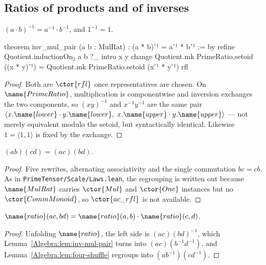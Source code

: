 \subsection{Ratios of products and of inverses}

\begin{lemma}
\label{Algebra:lem:inv-mul-pair}
$(a \cdot b)^{-1} = a^{-1} \cdot b^{-1}$, and $1^{-1} = 1$.
\end{lemma}

\begin{leancode}
theorem inv_mul_pair (a b : MulRat) :
    (a * b)⁻¹ = a⁻¹ * b⁻¹ := by
  refine Quotient.inductionOn₂ a b ?_
  intro x y
  change
    Quotient.mk PrimeRatio.setoid ((x * y)⁻¹) =
      Quotient.mk PrimeRatio.setoid (x⁻¹ * y⁻¹)
  rfl
\end{leancode}

\begin{proof}
Both are $\ctor{rfl}$ once representatives are chosen.  On
$\name{PrimeRatio}$, multiplication is componentwise and inversion exchanges
the two components, so $(xy)^{-1}$ and $x^{-1}y^{-1}$ are the same pair
$\langle x.\name{lower}\cdot y.\name{lower},\;
 x.\name{upper}\cdot y.\name{upper}\rangle$ --- not merely equivalent modulo
the setoid, but syntactically identical.  Likewise $1 = \langle 1,1\rangle$ is
fixed by the exchange.
\end{proof}

\begin{lemma}
\label{Algebra:lem:four-shuffle}
$(ab)(cd) = (ac)(bd)$.
\end{lemma}

\begin{proof}
Five rewrites, alternating associativity and the single commutation $bc = cb$.
As in \texttt{PrimeTensor/Scale/Laws.lean}, the regrouping is written out
because $\name{MulRat}$ carries $\ctor{Mul}$ and $\ctor{One}$ instances but no
$\ctor{CommMonoid}$, so $\ctor{ac\_rfl}$ is not available.
\end{proof}

\begin{lemma}\label{Algebra:lem:ratio-mul}
$\name{ratio}(ac, bd) = \name{ratio}(a,b) \cdot \name{ratio}(c,d)$.
\end{lemma}

\begin{proof}
Unfolding $\name{ratio}$, the left side is $(ac)(bd)^{-1}$, which
Lemma~\ref{Algebra:lem:inv-mul-pair} turns into $(ac)(b^{-1}d^{-1})$, and
Lemma~\ref{Algebra:lem:four-shuffle} regroups into
$(ab^{-1})(cd^{-1})$.
\end{proof}

